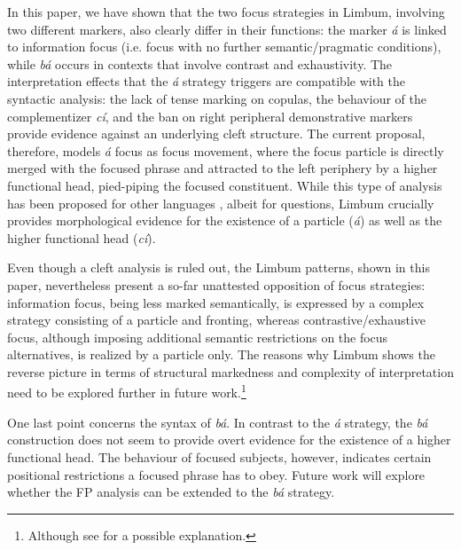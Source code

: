 \documentclass[output=paper,
modfonts
]{langscibook}
\begin{document}
In this paper, we have shown that the two focus strategies in Limbum, involving two different markers, also clearly differ in their functions: the marker \textit{á} is linked to information focus (i.e. focus with no further semantic/pragmatic conditions), while \textit{bá} occurs in contexts that involve contrast and exhaustivity. The interpretation effects that the {\em \'a} strategy triggers are compatible with the syntactic analysis: the lack of tense marking on copulas, the behaviour of the complementizer \textit{cí}, and the ban on right peripheral demonstrative markers provide evidence against an underlying cleft structure. The current proposal, therefore, models {\em\'a} focus as focus movement, where the focus particle is directly merged with the focused phrase and attracted to the left periphery by a higher functional head, pied-piping the focused constituent. While this type of analysis has been proposed for other languages \citep{Hagstrom1998,Cable2010}, albeit for questions, Limbum crucially provides morphological evidence for the existence of a particle ({\em \'a}) as well as the higher functional head ({\em c\'i}).

Even though a cleft analysis is ruled out, the Limbum patterns, shown in this paper, nevertheless present a so-far unattested opposition of focus strategies: information focus, being less marked semantically, is expressed by a complex strategy consisting of a particle and fronting, whereas contrastive/exhaustive focus, although imposing additional semantic restrictions on the focus alternatives, is realized by a particle only. The reasons why Limbum shows the reverse picture in terms of structural markedness and complexity of interpretation need to be explored further in future work.\footnote{Although see \citet{Driemeltoappear} for a possible explanation.}

One last point concerns the syntax of {\em b\'a}. In contrast to the {\em \'a} strategy, the {\em b\'a} construction does not seem to provide overt evidence for the existence of a higher functional head. The behaviour of focused subjects, however, indicates certain positional restrictions a focused phrase has to obey. Future work will explore whether the FP analysis can be extended to the {\em b\'a} strategy.
\end{document}
